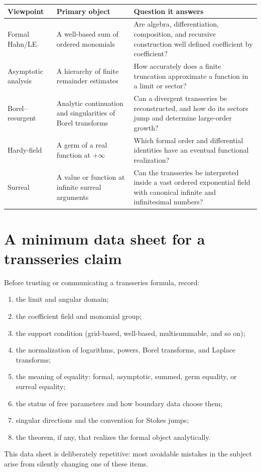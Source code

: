 \documentclass[11pt,openany]{book}
\theoremstyle{definition}
\theoremstyle{plain}
\theoremstyle{remark}
\begin{document}
\begin{center}
\small
\begin{tabularx}{\textwidth}{@{}p{}X X@{}}
\toprule
\textbf{Viewpoint} & \textbf{Primary object} & \textbf{Question it answers}\\
\midrule
Formal Hahn/LE
& A well-based sum of ordered monomials
& Are algebra, differentiation, composition, and recursive construction
well defined coefficient by coefficient?\\
Asymptotic analysis
& A hierarchy of finite remainder estimates
& How accurately does a finite truncation approximate a function in a limit
or sector?\\
Borel--resurgent
& Analytic continuation and singularities of Borel transforms
& Can a divergent transseries be reconstructed, and how do its sectors jump
and determine large-order growth?\\
Hardy-field
& A germ of a real function at $+\infty$
& Which formal order and differential identities have an eventual functional
realization?\\
Surreal
& A value or function at infinite surreal arguments
& Can the transseries be interpreted inside a vast ordered exponential field
with canonical infinite and infinitesimal numbers?\\
\bottomrule
\end{tabularx}
\end{center}

\section{A minimum data sheet for a transseries claim}

Before trusting or communicating a transseries formula, record:
\begin{enumerate}
 \item the limit and angular domain;
 \item the coefficient field and monomial group;
 \item the support condition (grid-based, well-based, multisummable, and so on);
 \item the normalization of logarithms, powers, Borel transforms, and Laplace
       transforms;
 \item the meaning of equality: formal, asymptotic, summed, germ equality, or
       surreal equality;
 \item the status of free parameters and how boundary data choose them;
 \item singular directions and the convention for Stokes jumps;
 \item the theorem, if any, that realizes the formal object analytically.
\end{enumerate}
This data sheet is deliberately repetitive: most avoidable mistakes in the
subject arise from silently changing one of these items.
\end{document}
